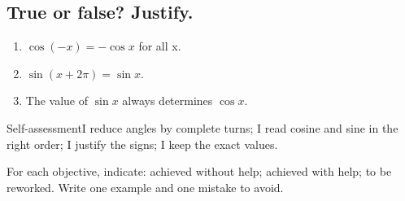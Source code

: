 \subsection*{True or false? Justify.}\label{C10-VF}
\begin{enumerate}
\item $\cos(-x)=-\cos x$ for all x.
\item $\sin(x+2\pi)=\sin x$.
\item The value of $\sin x$ always determines $\cos x$.
\end{enumerate}
\begin{repere}{Self-assessment}I reduce angles by complete turns; I read cosine and sine in the right order; I justify the signs; I keep the exact values.

For each objective, indicate: achieved without help; achieved with help; to be reworked. Write one example and one mistake to avoid.\end{repere}
\endgroup
\ifprof\fi
